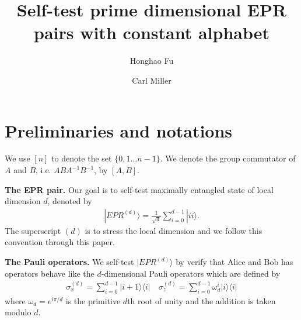 \documentclass[11pt,letterpaper]{article}
\newcommand{\ket}[1]{|#1\rangle}
\newcommand{\ketbra}[2]{|#1\rangle\langle#2|}
\newcommand{\1}{\mathbb{1}}
\newcommand{\EPR}[1]{EPR^{(#1)}}
\newcommand{\paulix}[1]{\sigma_x^{(#1)}}
\newcommand{\pauliz}[1]{\sigma_z^{(#1)}}
\theoremstyle{definition}
\begin{document}
\title{Self-test prime dimensional EPR pairs with constant alphabet}

\author[1]{Honghao Fu}
\author[1,2]{Carl Miller}

\renewcommand\Affilfont{\itshape\small}


\maketitle
\section{Preliminaries and notations}
We use $[n]$ to denote the set $\{0,1 \dots n-1\}$.
We denote the group commutator of $A$ and $B$, i.e. $ABA^{-1}B^{-1}$, by $[A,B]$.

\textbf{The EPR pair.} Our goal is to self-test maximally entangled state of local dimension $d$, denoted by 
\begin{align}
\ket{\EPR{d}} = \frac{1}{\sqrt{d}} \sum_{i = 0}^{d-1} \ket{ii}.
\end{align}
The superscript $(d)$ is to stress the local dimension and we follow this convention through this paper.

\textbf{The Pauli operators.} 
We self-test $\ket{\EPR{d}}$ by verify that Alice and Bob has operators behave like 
the $d$-dimensional Pauli operators which are defined by
\begin{align}
	\paulix{d} = \sum_{i=0}^{d-1} \ketbra{i+1}{i} \quad \pauliz{d} = \sum_{i=0}^{d-1} \omega_d^i\ketbra{i}{i}
\end{align}
where $\omega_d = e^{i\pi/d}$ is the primitive $d$th root of unity and the addition is taken modulo $d$.
\end{document}
